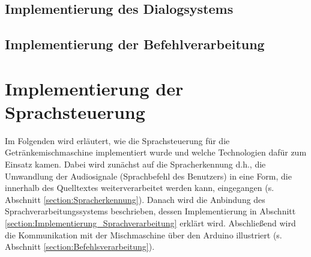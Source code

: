 \subsection{Implementierung des Dialogsystems}
\subsection{Implementierung der Befehlverarbeitung}
\section{Implementierung der Sprachsteuerung}
Im Folgenden wird erläutert, wie die Sprachsteuerung für die Getränkemischmaschine implementiert wurde und welche Technologien dafür zum Einsatz kamen. Dabei wird zunächst auf die Spracherkennung d.h., die Umwandlung der Audiosignale (Sprachbefehl des Benutzers) in eine Form, die innerhalb des Quelltextes weiterverarbeitet werden kann, eingegangen (s. Abschnitt \ref{section:Spracherkennung}). Danach wird die Anbindung des Sprachverarbeitungssystems beschrieben, dessen Implementierung in Abschnitt \ref{section:Implementierung_Sprachverarbeitung} erklärt wird. Abschließend wird die Kommunikation mit der Mischmaschine über den Arduino illustriert (s. Abschnitt \ref{section:Befehlsverarbeitung}).
